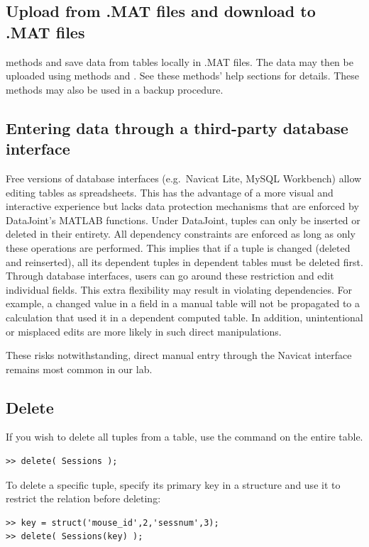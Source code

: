 \documentclass[10pt]{article}
\begin{document}
\subsection{Upload from  .MAT files and download to .MAT files}
 methods  and  save data from tables locally in .MAT files.  The data may then be uploaded using methods  and .  See these methods' help sections for details. These methods may also be used in a backup procedure.

\subsection{Entering data through a third-party database interface}
Free versions of database interfaces (e.g.~Navicat Lite, MySQL Workbench) allow editing tables as spreadsheets.  This has the advantage of a more visual and interactive experience but lacks data protection mechanisms that are enforced by DataJoint's MATLAB functions.  Under DataJoint, tuples can only be inserted or deleted in their entirety. All dependency constraints are enforced as long as only these operations are performed.  This implies that if a tuple is changed (deleted and reinserted), all its dependent tuples in dependent tables must be deleted first.  Through database interfaces, users can go around these restriction and edit individual fields.  This extra flexibility may result in violating dependencies.  For example, a changed value in a field in a manual table will not be propagated to a calculation that used it in a dependent computed table.  In addition, unintentional or misplaced edits are more likely in such direct manipulations. 

These risks notwithstanding, direct manual entry through the Navicat interface remains most common in our lab. 

\subsection{Delete}
If you wish to delete all tuples from a table, use the  command on the entire table. 
\begin{lstlisting}
>> delete( Sessions );
\end{lstlisting}

To delete a specific tuple, specify its primary key in a structure and use it to restrict the relation before deleting:
\begin{lstlisting}
>> key = struct('mouse_id',2,'sessnum',3);
>> delete( Sessions(key) );
\end{lstlisting}
\end{document}
